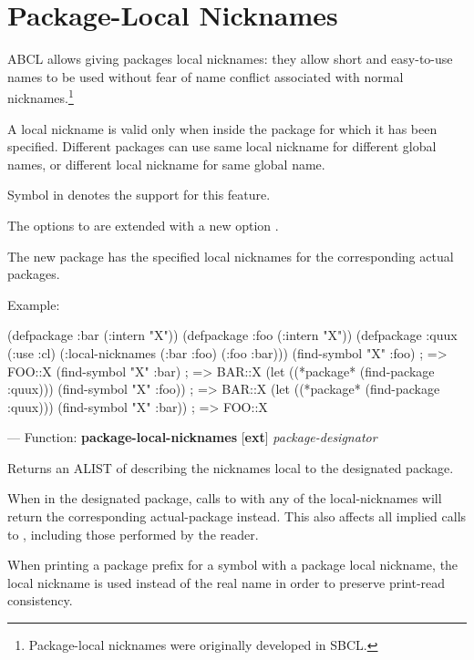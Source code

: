 \documentclass[10pt]{book}
\begin{document}
\section{Package-Local Nicknames}
\label{sec:pack-local-nickn}

ABCL allows giving packages local nicknames: they allow short and
easy-to-use names to be used without fear of name conflict associated
with normal nicknames.\footnote{Package-local nicknames were originally
developed in SBCL.}

A local nickname is valid only when inside the package for which it
has been specified. Different packages can use same local nickname for
different global names, or different local nickname for same global
name.

Symbol  in  denotes the
support for this feature.

The options to  are extended with a new option
.

The new package has the specified local nicknames for the corresponding
actual packages.

Example:
\begin{listing-lisp}
(defpackage :bar (:intern "X"))
(defpackage :foo (:intern "X"))
(defpackage :quux (:use :cl)
  (:local-nicknames (:bar :foo) (:foo :bar)))
(find-symbol "X" :foo) ; => FOO::X
(find-symbol "X" :bar) ; => BAR::X
(let ((*package* (find-package :quux)))
  (find-symbol "X" :foo))               ; => BAR::X
(let ((*package* (find-package :quux)))
  (find-symbol "X" :bar))               ; => FOO::X
\end{listing-lisp}

--- Function: \textbf{package-local-nicknames} [\textbf{ext}] \textit{package-designator}

\begin{adjustwidth}{5em}{5em}
  Returns an ALIST of 
  describing the nicknames local to the designated package.

  When in the designated package, calls to  with any
  of the local-nicknames will return the corresponding actual-package
  instead. This also affects all implied calls to ,
  including those performed by the reader.

  When printing a package prefix for a symbol with a package local
  nickname, the local nickname is used instead of the real name in order
  to preserve print-read consistency.
\end{adjustwidth}
\end{document}

